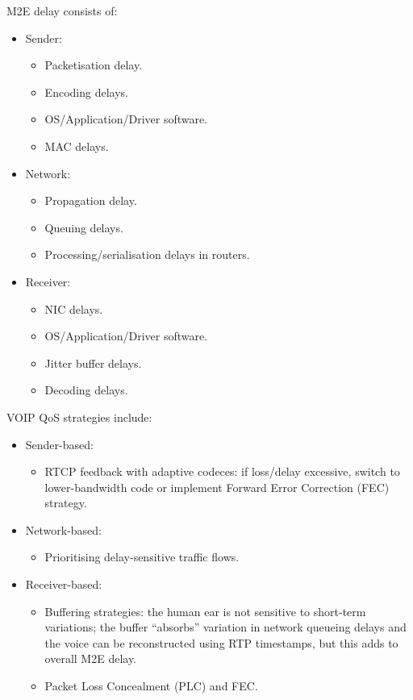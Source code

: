 \documentclass[a4paper,11pt]{article}
\begin{document}
M2E delay consists of:
\begin{itemize}
    \item   Sender:
            \begin{itemize}
                \item   Packetisation delay.
                \item   Encoding delays.
                \item   OS/Application/Driver software.
                \item   MAC delays.
            \end{itemize}

    \item   Network:
            \begin{itemize}
                \item   Propagation delay.
                \item   Queuing delays.
                \item   Processing/serialisation delays in routers.
            \end{itemize}

    \item   Receiver:
            \begin{itemize}
                \item   NIC delays.
                \item   OS/Application/Driver software.
                \item   Jitter buffer delays.
                \item   Decoding delays.
            \end{itemize}
\end{itemize}

VOIP QoS strategies include:
\begin{itemize}
    \item   Sender-based:
            \begin{itemize}
                \item RTCP feedback with adaptive codeces: if loss/delay excessive, switch to lower-bandwidth code or implement Forward Error Correction (FEC) strategy.
            \end{itemize}

    \item   Network-based:
            \begin{itemize}
                \item   Prioritising delay-sensitive traffic flows.
            \end{itemize}

    \item   Receiver-based:
            \begin{itemize}
                \item   Buffering strategies: the human ear is not sensitive to short-term variations;
                    the buffer ``absorbs'' variation in network queueing delays and the voice can be reconstructed using RTP timestamps, but this adds to overall M2E delay.
                \item   Packet Loss Concealment (PLC) and FEC.
            \end{itemize}
\end{itemize}
\end{document}
